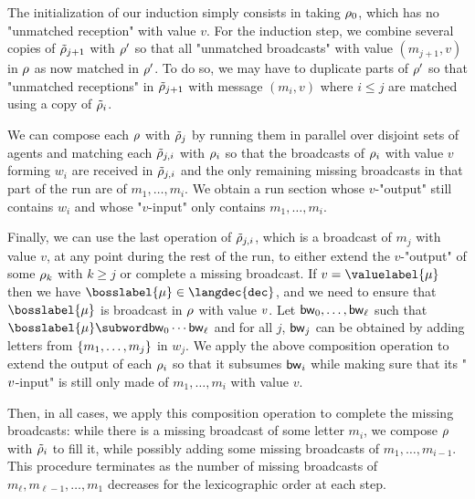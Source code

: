 The initialization of our induction simply consists in taking $\rho_0$, which has no "unmatched reception" with value $v$. For the induction step, we combine several copies of $\Tilde{\rho}_{j+1}$ with $\rho'$ so that all "unmatched broadcasts" with value $(m_{j+1},v)$ in $\rho$ as now matched in $\rho'$. To do so, we may have to duplicate parts of $\rho'$ so that "unmatched receptions" in $\Tilde{\rho}_{j+1}$ with message $(m_i,v)$ where $i \leq j$ are matched using a copy of $\Tilde{\rho}_i$. 

We can compose each $\rho$ with $\Tilde{\rho}_{j}$ by running them in parallel over disjoint sets of agents and matching each $\Tilde{\rho}_{j, i}$ with $\rho_i$ so that the broadcasts of $\rho_i$ with value $v$ forming $w_i$ are received in $\Tilde{\rho}_{j, i}$ and the only remaining missing broadcasts in that part of the run are of $m_1, \ldots, m_i$.
We obtain a run section whose $v$-"output" still contains $w_i$ and whose "$v$-input" only contains $m_1, \ldots, m_i$. 

Finally, we can use the last operation of $\Tilde{\rho}_{j, i}$, which is a broadcast of $m_j$ with value $v$, at any point during the rest of the run, to either extend the $v$-"output" of some $\rho_k$ with $k \geq j$ or complete a missing broadcast.
% 	
If $\val = \valuelabel{\node}$ then we have $\bosslabel{\node} \in \langdec{\decsymb}$, and we need to ensure that $\bosslabel{\node}$ is broadcast in $\rho$ with value $v$.
Let $\mathsf{bw}_0, \ldots, \mathsf{bw}_\ell$ such that $\bosslabel{\node} \subword \bossspec_0\cdots\bossspec_\ell$ and for all $j$, $\mathsf{bw}_j$ can be obtained by adding letters from $\{m_1,\ldots, m_j\}$ in $w_j$.
We apply the above composition operation to extend the output of each $\rho_{i}$ so that it subsumes $\mathsf{bw}_i$ while making sure that its "$v$-input" is still only made of $m_1, \ldots, m_i$ with value $v$. 

Then, in all cases, we apply this composition operation to complete the missing broadcasts: while there is a missing broadcast of some letter $m_i$, we compose $\rho$ with $\Tilde{\rho}_i$ to fill it, while possibly adding some missing broadcasts of $m_1, \ldots, m_{i-1}$.
This procedure terminates as the number of missing broadcasts of $m_\ell, m_{\ell-1}, \ldots, m_1$ decreases for the lexicographic order at each step.

